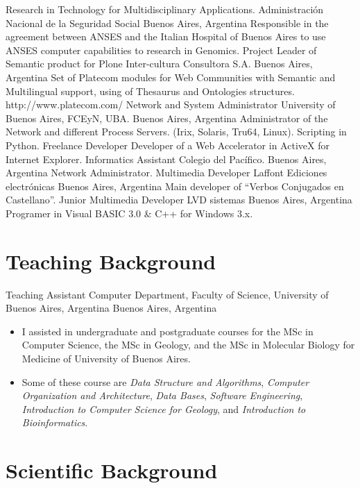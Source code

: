 \documentclass[9pt,a4paper,sans]{moderncv}
\newcommand{\DC}{Computer Department}
\newcommand{\FCEN}{Faculty of Science}
\newcommand{\UBA}{University of Buenos Aires}
\begin{document}
	{Research in Technology for Multidisciplinary Applications.}
	{Administración Nacional de la Seguridad Social}
	{Buenos Aires, Argentina}
	{}
	{Responsible in the agreement between ANSES and the Italian Hospital of Buenos Aires to use ANSES computer capabilities to research in Genomics.}
	{Project Leader of Semantic product for Plone}
	{Inter-cultura Consultora S.A.}
	{Buenos Aires, Argentina}
	{}
	{Set of Platecom modules for Web Communities with Semantic and Multilingual support, using of Thesaurus and Ontologies structures.  http://www.platecom.com/}
	{Network and System Administrator}
	{\UBA, FCEyN, UBA.}
	{Buenos Aires, Argentina}
	{}
	{Administrator of the Network and different Process Servers. (Irix, Solaris, Tru64, Linux). Scripting in Python.}
	{Freelance Developer}
	{}
	{}
	{}
	{Developer of a Web Accelerator in ActiveX for Internet Explorer.}
	{Informatics Assistant}
	{Colegio del Pacífico.}
	{Buenos Aires, Argentina}
	{}
	{Network Administrator. }
	{Multimedia Developer}
	{Laffont Ediciones electrónicas}
	{Buenos Aires, Argentina}
	{}
	{Main developer of ``Verbos Conjugados en Castellano''.}
	{Junior Multimedia Developer}
	{LVD sistemas}
	{Buenos Aires, Argentina}
	{}
	{Programer in Visual BASIC 3.0 \& C++ for Windows 3.x.}
\label{profesional:hasta}

\section{Teaching Background}\label{docentes:desde}

        {Teaching Assistant}
	{\DC, \FCEN, \UBA, Argentina}
	{Buenos Aires, Argentina}
	{}
	{\begin{itemize}
	\item I assisted in undergraduate and postgraduate courses for the MSc in Computer Science,
		the MSc in Geology, and the MSc in Molecular Biology for Medicine of University of Buenos Aires.
	\item Some of these course are \emph{Data Structure and Algorithms},
		\emph{Computer Organization and Architecture}, \emph{Data Bases},
		\emph{Software Engineering}, \emph{Introduction to Computer Science for Geology},
		and \emph{Introduction to Bioinformatics}.
	\end{itemize}}

\section{Scientific Background}\label{cientificos:desde}
\end{document}
